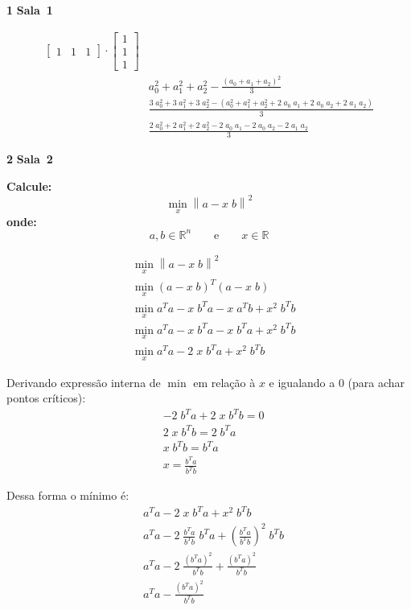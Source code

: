 \documentclass{article}
\newcommand{\R}{\mathbb{R}}
\newenvironment{question}
    {\medskip\bfseries\large}
    {\medskip}
\newcounter{exe-list}
\newenvironment{exe}[2][Sala]
    {\bigskip\noindent\par\ifthenelse{\equal{#1}{}}%
        {\textbf{\LARGE #2}}%
        {\textbf{\LARGE #1~#2}}%
    \medskip\noindent\par}
    {\bigskip}
\begin{document}
\begin{exe}{1}
\begin{align*}
{\begin{bmatrix}
                    1 & 1 & 1
                \end{bmatrix} \cdot \begin{bmatrix}
                    1 \\ 1 \\ 1
                \end{bmatrix}
            } \\
        & a_0^2 + a_1^2 + a_2^2
            - \frac{(a_0 + a_1 + a_2)^2}{3} \\
        & \frac{3 \; a_0^2 + 3 \; a_1^2 + 3 \; a_2^2
            - (a_0^2 + a_1^2 + a_2^2
                + 2 \; a_0 \; a_1
                + 2 \; a_0 \; a_2
                + 2 \; a_1 \; a_2)
            }{3} \\
        & \frac{2 \; a_0^2 + 2 \; a_1^2 + 2 \; a_2^2
            - 2 \; a_0 \; a_1
            - 2 \; a_0 \; a_2
            - 2 \; a_1 \; a_2
            }{3}
    \end{align*}
\end{exe}

\begin{exe}{2}
    \begin{question}
        Calcule:
        \[
            \min_x \left\|
                a - x \; b
            \right\|^2
        \]
        onde:
        \[
            a, b \in \R^n
            \qquad\text{e}\qquad
            x \in \R
        \]
    \end{question}

    \begin{align*}
        &\min_x \left\| a - x \; b \right\|^2 \\
        &\min_x (a - x \; b)^T (a - x \; b) \\
        &\min_x a^T a - x \; b^T a - x \; a^T b + x^2 \; b^T b \\
        &\min_x a^T a - x \; b^T a - x \; b^T a + x^2 \; b^T b \\
        &\min_x a^T a - 2 \; x \; b^T a + x^2 \; b^T b
    \end{align*}

    Derivando expressão interna de \(\min\) em relação à \(x\)
    e igualando a \(0\) (para achar pontos críticos):
    \begin{align*}
        &- 2 \; b^T a + 2 \; x \; b^T b = 0 \\
        &2 \; x \; b^T b = 2 \; b^T a \\
        &x \; b^T b = b^T a \\
        &x = \frac{b^T a}{b^T b}
    \end{align*}

    Dessa forma o mínimo é:
    \begin{align*}
        &a^T a - 2 \; x \; b^T a + x^2 \; b^T b \\
        &a^T a - 2 \; \frac{b^T a}{b^T b} \; b^T a
            + \left(\frac{b^T a}{b^T b}\right)^2 \; b^T b \\
        &a^T a - 2 \; \frac{(b^T a)^2}{b^T b}
            + \frac{(b^T a)^2}{b^T b} \\
        &a^T a - \frac{(b^T a)^2}{b^T b}
    \end{align*}
\end{exe}
\end{document}

